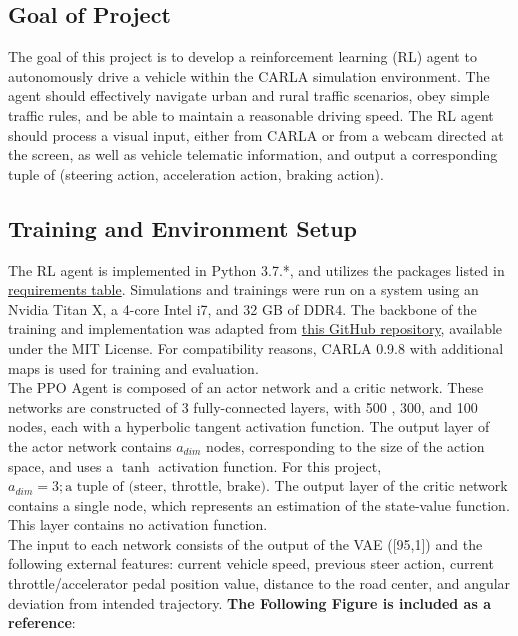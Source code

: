 \documentclass[12pt,oneside,letterpaper]{article}
\begin{document}
\subsection{Goal of Project}
The goal of this project is to develop a reinforcement learning (RL) agent
to autonomously drive a vehicle within the CARLA simulation environment. The agent should effectively navigate urban and rural traffic scenarios, obey simple traffic rules, and be able to maintain a reasonable driving speed. The RL agent should process a visual input, either from CARLA or from a webcam directed at the screen, as well as vehicle telematic information, and output a corresponding tuple of (steering action, acceleration action, braking action).
\subsection{Training and Environment Setup}
The RL agent is implemented in Python 3.7.*, and utilizes the packages listed in \hyperlink{table:RequirementsTable}{requirements table}. Simulations and trainings were run on a system using an Nvidia Titan X, a 4-core Intel i7, and 32 GB of DDR4. The backbone of the training and implementation was adapted from \href{https://github.com/idreesshaikh/Autonomous-Driving-in-Carla-using-Deep-Reinforcement-Learning/tree/main}{this GitHub repository}, available under the MIT License. For compatibility reasons, CARLA 0.9.8 with additional maps is used for training and evaluation. \\
The PPO Agent is composed of an actor network and a critic network. These networks are constructed of 3 fully-connected layers, with 500 , 300, and 100 nodes, each with a hyperbolic tangent activation function. The output layer of the actor network contains $a_{dim}$ nodes, corresponding to the size of the action space, and uses a $\tanh$ activation function. For this project, $a_{dim} = 3; \text{a tuple of (steer, throttle, brake)} $. The output layer of the critic network contains a single node, which represents an estimation of the state-value function. This layer contains no activation function. \\
The input to each network consists of the output of the VAE ([95,1]) and the following external features: current vehicle speed, previous steer action, current throttle/accelerator pedal position value, distance to the road center, and angular deviation from intended trajectory. \textbf{The Following Figure is included as a reference}:
\end{document}
